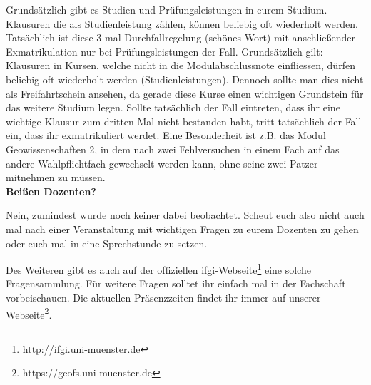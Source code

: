 Grundsätzlich gibt es Studien und Prüfungsleistungen in eurem Studium. Klausuren die als Studienleistung zählen, können beliebig oft wiederholt werden. Tatsächlich ist diese 3-mal-Durchfallregelung (schönes Wort) mit anschließender Exmatrikulation nur bei Prüfungsleistungen der Fall. Grundsätzlich gilt: Klausuren in Kursen, welche nicht in die Modulabschlussnote einfliessen, dürfen beliebig oft wiederholt werden (Studienleistungen). Dennoch sollte man dies nicht als Freifahrtschein ansehen, da gerade diese Kurse einen wichtigen Grundstein für das weitere Studium legen.
Sollte tatsächlich der Fall eintreten, dass ihr eine wichtige Klausur zum dritten Mal nicht bestanden habt, tritt tatsächlich der Fall ein, dass ihr exmatrikuliert werdet. Eine Besonderheit ist z.B. das Modul Geowissenschaften 2, in dem nach zwei Fehlversuchen in einem Fach auf das andere Wahlpflichtfach gewechselt werden kann, ohne seine zwei Patzer mitnehmen zu müssen.\\

\textbf{Beißen Dozenten?}

Nein, zumindest wurde noch keiner dabei beobachtet. Scheut euch also nicht auch mal nach einer Veranstaltung mit wichtigen Fragen zu eurem Dozenten zu gehen oder euch mal in eine Sprechstunde zu setzen.

Des Weiteren gibt es auch auf der ofﬁziellen ifgi-Webseite\footnote{http://ifgi.uni-muenster.de} eine solche Fragensammlung. Für weitere Fragen solltet ihr einfach mal in der Fachschaft vorbeischauen. Die aktuellen Präsenzzeiten ﬁndet ihr immer auf unserer Webseite\footnote{https://geofs.uni-muenster.de}.

